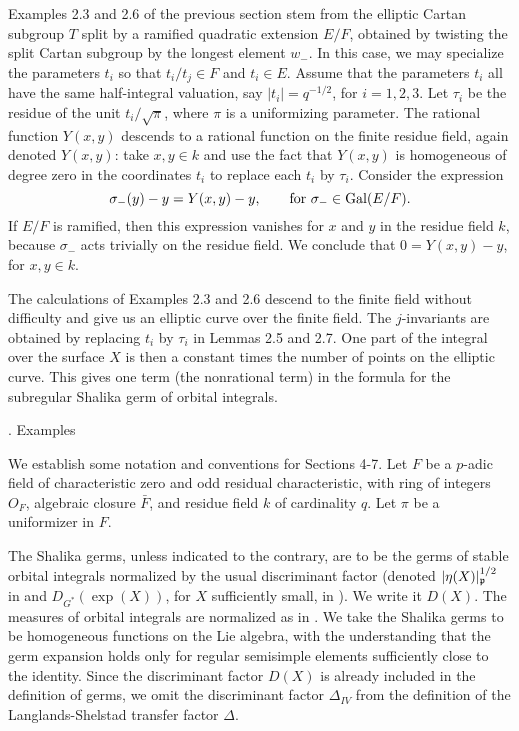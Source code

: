 Examples 2.3 and 2.6 of the previous section stem from the elliptic
Cartan subgroup $T$ split by a ramified quadratic extension $E/F$,
obtained by twisting the split Cartan subgroup by the longest element
$w_-$.  In this case, we may specialize the parameters $t_i$ so that
$t_i/t_j\in F$ and $t_i\in E$.
Assume that the parameters $t_i$ all have the
same half-integral valuation, say $|t_i| = q^{-1/2}$, for $i=1,2,3$.
Let $\tau_i$ be the residue of the unit $t_i/\sqrt{\pi}$, where
$\pi$ is a uniformizing parameter.
The rational function $Y(x,y)$ descends to a rational
function on the finite residue field, again denoted
$Y(x,y)$: take $x,y\in k$ and use the fact that
$Y(x,y)$ is homogeneous of degree zero in the coordinates
$t_i$ to replace each $t_i$ by $\tau_i$.
  Consider the expression
$$\sigma_{-}(y) - y = Y(x,y) - y,\qquad\hbox{for } \sigma_{-}\in \operatorname{Gal}(E/F).$$
If $E/F$ is ramified, then this expression vanishes
for $x$ and $y$ in the residue field $k$, because
$\sigma_{-}$ acts trivially on the
residue field. We conclude that 
$0 = Y(x,y)-y$,
for $x,y\in k$.

The calculations of Examples 2.3 and
2.6 descend to the finite field without difficulty and give us an
elliptic curve over the finite field.  
The $j$-invariants are obtained by replacing $t_i$ by
$\tau_i$ in Lemmas 2.5 and 2.7.
One part of
the integral over the surface $X$ 
is then a constant times the number
of points on the elliptic curve.  This gives one term
(the nonrational term) in the formula
for the subregular Shalika germ of orbital integrals. 


. Examples\endhead

We establish some notation and conventions for Sections
4-7.  Let $F$ be a $p$-adic field of characteristic
zero and odd residual characteristic, with ring
of integers $O_F$, algebraic closure $\bar F$, and
residue field $k$ of cardinality $q$.  Let $\pi$ be
a uniformizer in $F$. 

The Shalika germs, unless indicated to the contrary,
are to be the germs of stable orbital integrals 
normalized by the usual discriminant factor
(denoted $|\eta(X)|^{1/2}_{{\frak p}}$ in \cite{HC} and
$D_{G^*}(\exp(X))$, for $X$ sufficiently small,
 in \cite{LS}).  We write it $D(X)$.
The measures of orbital integrals are normalized as
in \cite{L}.  We take the Shalika germs to be homogeneous
functions on the Lie algebra, with the understanding
that the germ expansion holds only for regular
semisimple elements sufficiently close to the 
identity.  Since the discriminant factor $D(X)$ is
already included in the definition of germs, we omit
the discriminant factor $\Delta_{IV}$ from the
definition of the Langlands-Shelstad transfer factor
$\Delta$.


